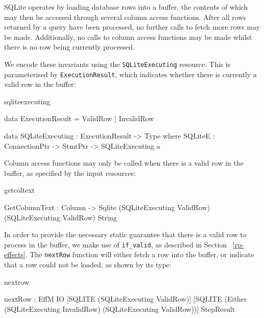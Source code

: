 SQLite operates by loading database rows into a buffer, the contents of which may then be accessed through several column access functions. After all rows returned by a query have been processed, no further calls to fetch more rows may be made. Additionally, no calls to column access functions may be made whilst there is no row being currently processed. 

We encode these invariants using the \texttt{SQLiteExecuting}
resource. This is parameterised by \texttt{ExecutionResult},
which indicates whether there is currently a valid row in the buffer:

\begin{SaveVerbatim}{sqliteexecuting}

data ExecutionResult = ValidRow
                     | InvalidRow

data SQLiteExecuting : ExecutionResult -> Type where
  SQLiteE : ConnectionPtr -> 
            StmtPtr -> SQLiteExecuting a
  
\end{SaveVerbatim}
\noindent
Column access functions may only be called when there is a valid row in the
buffer, as specified by the input resources:

\begin{SaveVerbatim}{getcoltext}

GetColumnText : Column -> 
                Sqlite (SQLiteExecuting ValidRow) 
                       (SQLiteExecuting ValidRow)
                       String
                         
\end{SaveVerbatim}

\noindent
In order to provide the necessary static guarantee that there is a valid row to
process in the buffer, we make use of \texttt{if\_valid}, as described in Section ~\ref{rp-effects}. The
\texttt{nextRow} function will either fetch a row into the buffer, or indicate
that a row could not be loaded, as shown by its type:

\noindent
\begin{SaveVerbatim}{nextrow}

nextRow : EffM IO [SQLITE (SQLiteExecuting ValidRow)] 
         [SQLITE (Either (SQLiteExecuting InvalidRow)
                 (SQLiteExecuting ValidRow))] StepResult

\end{SaveVerbatim}

